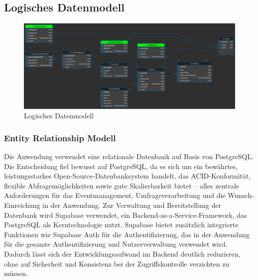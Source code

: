 \documentclass[a4paper,12pt]{article}
\begin{document}
\subsection{Logisches Datenmodell}

\begin{figure}[h]
  \centering
  \includegraphics[width=1\textwidth]{Abbildungen/erm.png}
  \caption{Logisches Datenmodell}
  \label{fig:logisches_datenmodell}
\end{figure}


\subsubsection{Entity Relationship Modell}
Die Anwendung verwendet eine relationale Datenbank auf Basis von PostgreSQL. Die Entscheidung fiel bewusst auf PostgreSQL, da es sich um ein bewährtes, leistungsstarkes Open-Source-Datenbanksystem handelt, das ACID-Konformität, flexible Abfragemöglichkeiten sowie gute Skalierbarkeit bietet – alles zentrale Anforderungen für das Eventmanagement, Umfrageverarbeitung und die Wunsch-Einreichung in der Anwendung. Zur Verwaltung und Bereitstellung der Datenbank wird Supabase verwendet, ein Backend-as-a-Service-Framework, das PostgreSQL als Kerntechnologie nutzt. Supabase bietet zusätzlich integrierte Funktionen wie Supabase Auth für die Authentifizierung, das in der Anwendung für die gesamte Authentifizierung und Nutzerverwaltung verwendet wird. Dadurch lässt sich der Entwicklungsaufwand im Backend deutlich reduzieren, ohne auf Sicherheit und Konsistenz bei der Zugriffskontrolle verzichten zu müssen.

\end{document}
